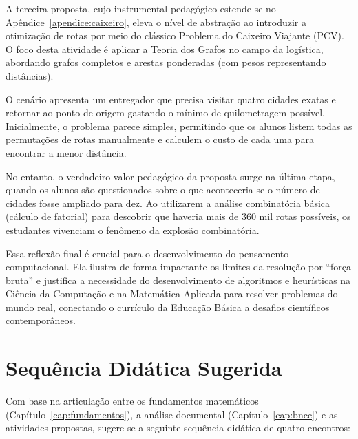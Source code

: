 \documentclass[
  12pt,
  oneside,
  a4paper,
  english,
  brazilian
  ]{abntex2}
\theoremstyle{definition}
\begin{document}
A terceira proposta, cujo instrumental pedagógico estende-se no Apêndice~\ref{apendice:caixeiro}, eleva o nível de abstração ao introduzir a otimização de rotas por meio do clássico Problema do Caixeiro Viajante (PCV). O foco desta atividade é aplicar a Teoria dos Grafos no campo da logística, abordando grafos completos e arestas ponderadas (com pesos representando distâncias).

O cenário apresenta um entregador que precisa visitar quatro cidades exatas e retornar ao ponto de origem gastando o mínimo de quilometragem possível. Inicialmente, o problema parece simples, permitindo que os alunos listem todas as permutações de rotas manualmente e calculem o custo de cada uma para encontrar a menor distância.

No entanto, o verdadeiro valor pedagógico da proposta surge na última etapa, quando os alunos são questionados sobre o que aconteceria se o número de cidades fosse ampliado para dez. Ao utilizarem a análise combinatória básica (cálculo de fatorial) para descobrir que haveria mais de 360 mil rotas possíveis, os estudantes vivenciam o fenômeno da explosão combinatória.

Essa reflexão final é crucial para o desenvolvimento do pensamento computacional. Ela ilustra de forma impactante os limites da resolução por ``força bruta'' e justifica a necessidade do desenvolvimento de algoritmos e heurísticas na Ciência da Computação e na Matemática Aplicada para resolver problemas do mundo real, conectando o currículo da Educação Básica a desafios científicos contemporâneos.

\section{Sequência Didática Sugerida}
\label{sec:sequencia_didatica}

Com base na articulação entre os fundamentos matemáticos (Capítulo~\ref{cap:fundamentos}), a análise documental (Capítulo~\ref{cap:bncc}) e as atividades propostas, sugere-se a seguinte sequência didática de quatro encontros:
\end{document}
